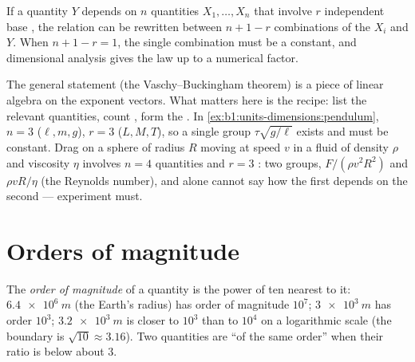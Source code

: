 \begin{proposition}\label{prop:b1:units-dimensions:pi}
If a quantity $Y$ depends on $n$ quantities $X_1, \dots, X_n$ that
involve $r$ independent base , the relation can be rewritten
between $n + 1 - r$  combinations of the $X_i$ and $Y$.
When $n + 1 - r = 1$, the single combination must be a constant, and
dimensional analysis gives the law up to a numerical factor.
\end{proposition}
\admitted

\begin{remark}\label{rem:b1:units-dimensions:pi}
The general statement (the Vaschy--Buckingham theorem) is a piece of
linear algebra on the exponent vectors. What matters here is the recipe:
list the relevant quantities, count , form the . In \cref{ex:b1:units-dimensions:pendulum}, $n = 3$
($\ell, m, g$), $r = 3$ ($L, M, T$), so a single group
$\tau\sqrt{g/\ell}$ exists and must be constant. Drag on a sphere of
radius $R$ moving at speed $v$ in a fluid of density $\rho$ and viscosity
$\eta$ involves $n = 4$ quantities and $r = 3$ : two groups,
$F/(\rho v^2 R^2)$ and $\rho v R/\eta$ (the Reynolds number), and
 alone cannot say how the first depends on the second ---
experiment must.
\end{remark}

\section{Orders of magnitude}

\begin{definition}\label{def:b1:units-dimensions:oom}
The \emph{order of magnitude} of a quantity is the power of ten nearest
to it: $\qty{6.4e6}{m}$ (the Earth's radius) has order of magnitude
$10^7$; $\qty{3e3}{m}$ has order $10^3$; $\qty{3.2e3}{m}$ is closer to
$10^3$ than to $10^4$ on a logarithmic scale (the boundary is
$\sqrt{10} \approx 3.16$). Two quantities are ``of the same order'' when
their ratio is below about $3$.
\end{definition}

